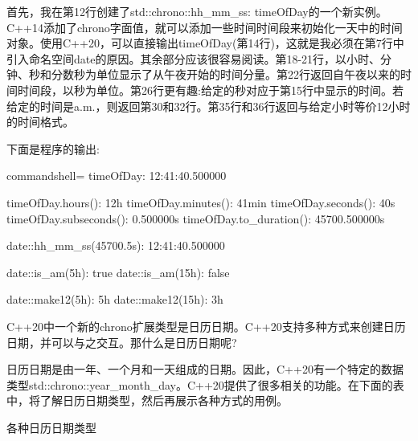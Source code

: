 首先，我在第12行创建了std::chrono::hh\_mm\_ss: timeOfDay的一个新实例。C++14添加了chrono字面值，就可以添加一些时间时间段来初始化一天中的时间对象。使用C++20，可以直接输出timeOfDay(第14行)，这就是我必须在第7行中引入命名空间date的原因。其余部分应该很容易阅读。第18-21行，以小时、分钟、秒和分数秒为单位显示了从午夜开始的时间分量。第22行返回自午夜以来的时间时间段，以秒为单位。第26行更有趣:给定的秒对应于第15行中显示的时间。若给定的时间是a.m.，则返回第30和32行。第35行和36行返回与给定小时等价12小时的时间格式。

下面是程序的输出:

\begin{tcblisting}{commandshell={}}
timeOfDay: 12:41:40.500000

timeOfDay.hours(): 12h
timeOfDay.minutes(): 41min
timeOfDay.seconds(): 40s
timeOfDay.subseconds(): 0.500000s
timeOfDay.to_duration(): 45700.500000s

date::hh_mm_ss(45700.5s): 12:41:40.500000

date::is_am(5h): true
date::is_am(15h): false

date::make12(5h): 5h
date::make12(15h): 3h
\end{tcblisting}


C++20中一个新的chrono扩展类型是日历日期。C++20支持多种方式来创建日历日期，并可以与之交互。那什么是日历日期呢?

日历日期是由一年、一个月和一天组成的日期。因此，C++20有一个特定的数据类型std::chrono::year\_month\_day。C++20提供了很多相关的功能。在下面的表中，将了解日历日期类型，然后再展示各种方式的用例。

\begin{center}
各种日历日期类型
\end{center}

